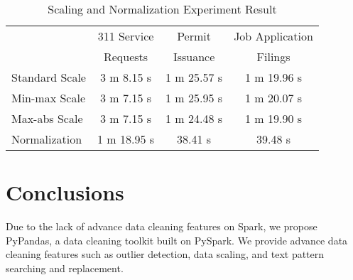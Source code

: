 \documentclass[sigconf]{acmart}
\begin{document}
\begin{table}
\caption{Scaling and Normalization Experiment Result}   
\label{tab:Scaling and Normalization Experiment Result}
\begin{tabular}{lccc}   
 	                      &  311 Service  &  Permit    &  Job Application \\ &Requests&Issuance&Filings   \\  
\hline
Standard Scale   & 3 m 8.15 s     & 1 m 25.57 s & 1 m 19.96 s            \\ 
Min-max Scale  &  3 m 7.15 s   & 1 m 25.95 s  & 1 m 20.07 s             \\  
Max-abs Scale  & 3 m 7.15 s     &  1 m 24.48 s  & 1 m 19.90 s             \\ 
Normalization    & 1 m 18.95 s     &  38.41 s & 39.48 s             \\ 

\end{tabular}   
\end{table}

\section{Conclusions}
Due to the lack of advance data cleaning features on Spark, we propose PyPandas, a data cleaning toolkit built on PySpark. We provide advance data cleaning features such as outlier detection, data scaling, and text pattern searching and replacement.



\end{document}
